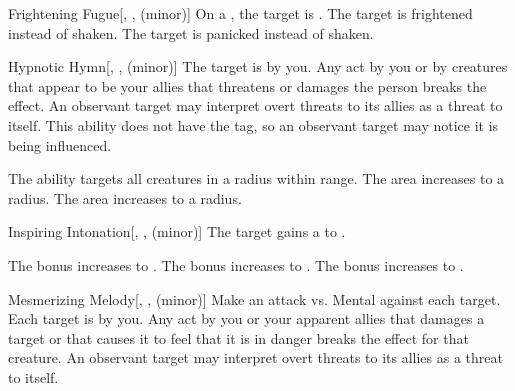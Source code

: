{\begin{freeability}{Frightening Fugue}[, ,  (minor)]
                \rankline
                 On a , the target is .
                 The target is frightened instead of shaken.
                 The target is panicked instead of shaken.
            \end{freeability}

            \begin{freeability}{Hypnotic Hymn}[, ,  (minor)]
                \hit The target is  by you.
                Any act by you or by creatures that appear to be your allies that threatens or damages the  person breaks the effect.
                An observant target may interpret overt threats to its allies as a threat to itself.
                This ability does not have the  tag, so an observant target may notice it is being influenced.

                \rankline
                 The ability targets all creatures in a \areasmall radius within \rngmed range.
                 The area increases to a \areamed radius.
                 The area increases to a \arealarge radius.
            \end{freeability}

            \begin{freeability}{Inspiring Intonation}[, ,  (minor)]
                The target gains a   to .

                \rankline
                 The bonus increases to .
                 The bonus increases to .
                 The bonus increases to .
            \end{freeability}

            \begin{freeability}{Mesmerizing Melody}[, ,  (minor)]
                Make an attack vs. Mental against each target.
                \hit Each target is \fascinated by you.
                Any act by you or your apparent allies that damages a target or that causes it to feel that it is in danger breaks the effect for that creature.
                An observant target may interpret overt threats to its allies as a threat to itself.


\end{freeability}}
